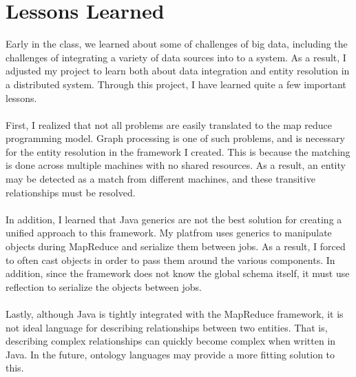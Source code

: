 \documentclass[12pt]{article}
\begin{document}
\section{Lessons Learned}
Early in the class, we learned about some of challenges of big data, including the challenges of integrating a variety of data sources into to a system. As a result, I adjusted my project to learn both about data integration and entity resolution in a distributed system.
Through this project, I have learned quite a few important lessons. \\\\
First, I realized that not all problems are easily translated to the map reduce programming model.
Graph processing is one of such problems, and is necessary for the entity resolution in the framework I created. This is because the matching is done across multiple machines with no shared resources. As a result, an entity may be detected as a match from different machines, and these transitive relationships must be resolved.\\\\
In addition, I learned that Java generics are not the best solution for creating a unified approach to this framework. 
My platfrom uses generics to manipulate objects during MapReduce and serialize them between jobs.
As a result, I forced to often cast objects in order to pass them around the various components.
In addition, since the framework does not know the global schema itself, it must use reflection to serialize the objects between jobs.\\\\
Lastly, although Java is tightly integrated with the MapReduce framework, it is not ideal language for describing relationships between two entities.
That is, describing complex relationships can quickly become complex when written in Java.
In the future, ontology languages may provide a more fitting solution to this.
\end{document}
